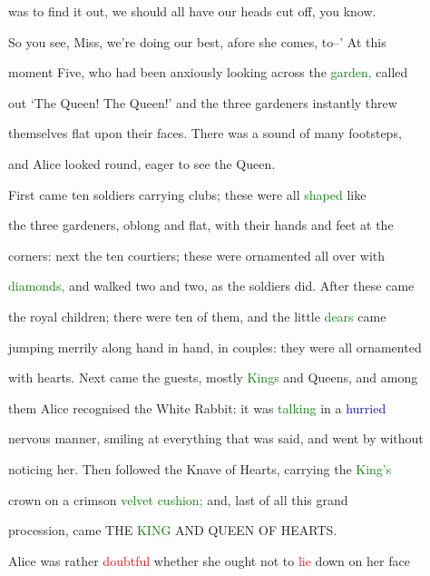 was to find it out, we should all have our heads cut off, you know.

 So you see, Miss, we’re doing our best, afore she comes, to--’ At this

 moment Five, who had been anxiously looking across the \textcolor{green}{garden,} called

 out ‘The Queen! The Queen!’ and the three gardeners instantly threw

 themselves flat upon their faces. There was a sound of many footsteps,

 and Alice looked round, \textcolor{BurntOrange}{eager} to see the Queen.



 First came ten \textcolor{BurntOrange}{soldiers} carrying clubs; these were all \textcolor{green}{shaped} like

 the three gardeners, oblong and flat, with their hands and feet at the

 corners: next the ten courtiers; these were ornamented all over with

 \textcolor{green}{diamonds,} and walked two and two, as the \textcolor{BurntOrange}{soldiers} did. After these came

 the royal \textcolor{BurntOrange}{children;} there were ten of them, and the little \textcolor{green}{dears} came

 jumping merrily along hand in hand, in couples: they were all ornamented

 with hearts. Next came the guests, mostly \textcolor{green}{Kings} and Queens, and among

 them Alice recognised the \textcolor{BurntOrange}{White} Rabbit: it was \textcolor{green}{talking} in a \textcolor{blue}{hurried}

 \textcolor{BurntOrange}{nervous} manner, \textcolor{BurntOrange}{smiling} at everything that was said, and went by without

 noticing her. Then followed the Knave of Hearts, carrying the \textcolor{green}{King’s}

 crown on a crimson \textcolor{green}{velvet} \textcolor{green}{cushion;} and, last of all this grand

 \textcolor{BurntOrange}{procession,} came THE \textcolor{green}{KING} AND QUEEN OF HEARTS.



 Alice was rather \textcolor{red}{doubtful} whether she ought not to \textcolor{red}{lie} down on her face

